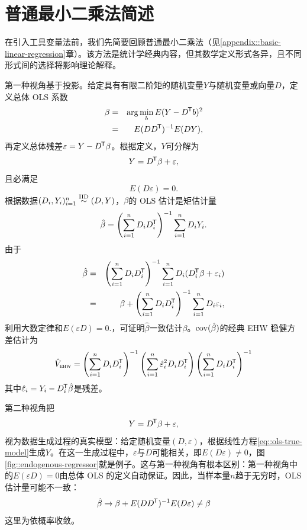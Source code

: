 \section{普通最小二乘法简述}



在引入工具变量法前，我们先简要回顾普通最小二乘法（见\ref{appendix::basic-linear-regression}章）。该方法是统计学经典内容，但其数学定义形式各异，且不同形式间的选择将影响理论解释。 

第一种视角基于投影。给定具有有限二阶矩的随机变量$Y$与随机变量或向量$D$，定义总体 OLS 系数
\begin{eqnarray*}
\beta  &=& \arg\min_b E(Y - D  ^{\mkern-1.5mu\mathsf{T}} b  )^2 \\
&=& E(DD^{\mkern-1.5mu\mathsf{T}})^{-1} E(DY),
\end{eqnarray*}
再定义总体残差$\varepsilon = Y -  D  ^{\mkern-1.5mu\mathsf{T}} \beta $。根据定义，$Y$可分解为
\begin{eqnarray}\label{eq::olsdecomposition}
Y = D  ^{\mkern-1.5mu\mathsf{T}} \beta  + \varepsilon,
\end{eqnarray}
且必满足
$$
E(  D \varepsilon) = 0.
$$
根据数据$(D_i,Y_i)_{i=1}^n \stackrel{\textup{IID}}{\sim} (D, Y)$，$\beta$的 OLS 估计是矩估计量
$$
\hat{\beta} = \left(  \sum_{i=1}^n D_i D_i^{\mkern-1.5mu\mathsf{T}} \right)^{-1}   \sum_{i=1}^n D_i Y_i  . 
$$
由于
\begin{eqnarray*}
\hat{\beta}  &=& \left(  \sum_{i=1}^n D_i D_i^{\mkern-1.5mu\mathsf{T}} \right)^{-1}  \sum_{i=1}^n D_i ( D_i^{\mkern-1.5mu\mathsf{T}} \beta + \varepsilon_i   )  \\
&=& \beta + \left(  \sum_{i=1}^n D_i D_i^{\mkern-1.5mu\mathsf{T}} \right)^{-1} \sum_{i=1}^n D_i  \varepsilon_i   ,
\end{eqnarray*}
利用大数定律和$E(\varepsilon D) = 0.$，可证明$\hat{\beta}$一致估计$\beta$。$\textup{cov}(\hat\beta)$的经典 EHW 稳健方差估计为
$$
\hat{V}_\textsc{ehw} = \left(  \sum_{i=1}^n D_i D_i^{\mkern-1.5mu\mathsf{T}} \right)^{-1}
\left(  \sum_{i=1}^n \hat{\varepsilon}_i^2 D_i D_i^{\mkern-1.5mu\mathsf{T}} \right)
\left(  \sum_{i=1}^n D_i D_i^{\mkern-1.5mu\mathsf{T}} \right)^{-1}
$$
其中$\hat{\varepsilon}_i  = Y_i - D_i^{\mkern-1.5mu\mathsf{T}} \hat{\beta}$是残差。 




第二种视角把
\begin{eqnarray}\label{eq::ols-true-model}
Y = D  ^{\mkern-1.5mu\mathsf{T}} \beta  + \varepsilon,
\end{eqnarray}
视为数据生成过程的真实模型：给定随机变量$(D, \varepsilon)$，根据线性方程\eqref{eq::ols-true-model}生成$Y$。在这一生成过程中，$\varepsilon$与$D$可能相关，即$E( D \varepsilon) \neq  0$，图\ref{fig::endogenous-regressor}就是例子。这与第一种视角有根本区别：第一种视角中的$E(\varepsilon D) = 0$由总体 OLS 的定义自动保证。因此，当样本量$n$趋于无穷时，OLS 估计量可能不一致：
$$
\hat{\beta} \rightarrow \beta + E(DD^{\mkern-1.5mu\mathsf{T}})^{-1} E(D\varepsilon) \neq \beta 
$$
这里为依概率收敛。 


